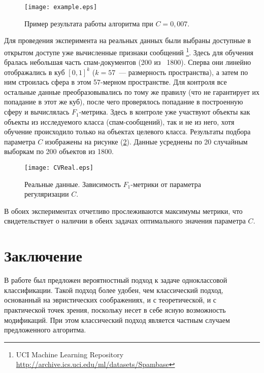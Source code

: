 \documentclass[12pt]{article}
\begin{document}
	\begin{figure}[!ht] %
		\centering
		\texttt{[image: example.eps]} 
		\vspace{-5pt}
		\caption{Пример результата работы алгоритма при $C = 0{,}007.$}
		\label{eps:example}
	\end{figure}

	Для проведения эксперимента на реальных данных были выбраны доступные в открытом доступе уже вычисленные признаки сообщений \footnote{UCI Machine Learning Repository \href{http://archive.ics.uci.edu/ml/datasets/Spambase}{http://archive.ics.uci.edu/ml/datasets/Spambase}}. 
	Здесь для обучения бралась небольшая часть спам-документов (200 из ~1800). 
	Сперва они линейно отображались в куб $[0, 1]^k$ ($k = 57$~--- размерность пространства), а затем по ним строилась сфера в этом 57-мерном пространстве. 
	Для контроля все остальные данные преобразовывались по тому же правилу (что не гарантирует их попадание в этот же куб), после чего проверялось попадание в построенную сферу и вычислялась $F_1$-метрика. 
	Здесь в контроле уже участвуют объекты как объекты из исследуемого класса (спам-сообщений), так и не из него, хотя обучение происходило только на объектах целевого класса. 
	Результаты подбора параметра $C$ изображены на рисунке (\ref{eps:CVReal}). Данные усреднены по 20 случайным выборкам по 200 объектов из 1800.

	\begin{figure}[!ht] %
		\centering
		\texttt{[image: CVReal.eps]} %
		\vspace{-5pt}
		\caption{Реальные данные. Зависимость $F_1$-метрики от параметра регуляризации $C.$}
		\label{eps:CVReal}
	\end{figure}

	В обоих экспериментах отчетливо прослеживаются максимумы метрики, что свидетельствует о наличии в обеих задачах оптимального значения параметра $C.$


\section{Заключение}						
	В работе был предложен вероятностный подход к задаче одноклассовой классификации. Такой подход более удобен, чем классический подход, основанный на эвристических соображениях, и с теоретической, и с практической точек зрения, поскольку несет в себе ясную возможность модификаций. При этом классический подход является частным случаем предложенного алгоритма.
\end{document}
